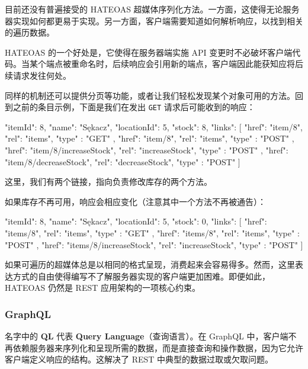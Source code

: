 目前还没有普遍接受的 HATEOAS 超媒体序列化方法。一方面，这使得无论服务器实现如何都更易于实现。另一方面，客户端需要知道如何解析响应，以找到相关的遍历数据。

HATEOAS 的一个好处是，它使得在服务器端实施 API 变更时不必破坏客户端代码。当某个端点被重命名时，后续响应会引用新的端点，客户端因此能获知应将后续请求发往何处。

同样的机制还可以提供分页等功能，或者让我们轻松发现某个对象可用的方法。回到之前的条目示例，下面是我们在发出 \texttt{GET} 请求后可能收到的响应：

\begin{codebox}[json]
{
    "itemId": 8,
    "name": "Sękacz",
    "locationId": 5,
    "stock": 8,
    "links": [
        {
            "href": "item/8",
            "rel": "items",
            "type" : "GET"
        },
        {
            "href": "item/8",
            "rel": "items",
            "type" : "POST"
        },
        {
            "href": "item/8/increaseStock",
            "rel": "increaseStock",
            "type" : "POST"
        },
        {
            "href": "item/8/decreaseStock",
            "rel": "decreaseStock",
            "type" : "POST"
        }
    ]
}
\end{codebox}

这里，我们有两个链接，指向负责修改库存的两个方法。

\label{idx:1639}
如果库存不再可用，响应会相应变化（注意其中一个方法不再被通告）：

\begin{codebox}[json]
{
    "itemId": 8,
    "name": "Sękacz",
    "locationId": 5,
    "stock": 0,
    "links": [
        {
            "href": "items/8",
            "rel": "items",
            "type" : "GET"
        },
        {
            "href": "items/8",
            "rel": "items",
            "type" : "POST"
        },
        {
            "href": "items/8/increaseStock",
            "rel": "increaseStock",
            "type" : "POST"
        }
    ]
}
\end{codebox}

\label{idx:1640}
如果可遍历的超媒体总是以相同的格式呈现，消费起来会容易得多。然而，这里表达方式的自由使得编写不了解服务器实现的客户端更加困难。即便如此，HATEOAS 仍然是 REST 应用架构的一项核心约束。

\subsubsection{GraphQL}

\label{idx:1641}
\label{idx:1642}
\label{idx:1643}
名字中的 \textbf{QL} 代表 \textbf{Query Language}（查询语言）。在 GraphQL 中，客户端不再依赖服务器来序列化和呈现所需的数据，而是直接查询和操作数据，因为它允许客户端定义响应的结构。这解决了 REST 中典型的数据过取或欠取问题。


